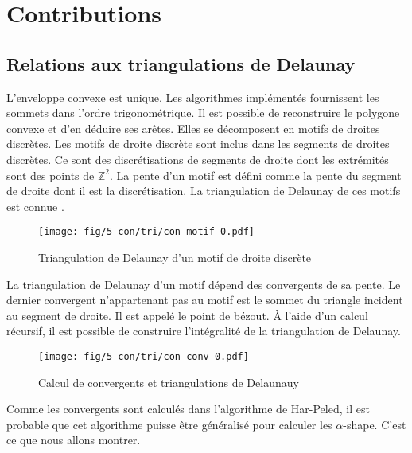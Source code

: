 \section{Contributions}

\subsection{Relations aux triangulations de Delaunay}


L'enveloppe convexe est unique. Les algorithmes implémentés fournissent les sommets dans l'ordre trigonométrique. Il est possible de reconstruire le polygone convexe et d'en déduire ses arêtes. Elles se décomposent en motifs de droites discrètes. Les motifs de droite discrète sont inclus dans les segments de droites discrètes. Ce sont des discrétisations de segments de droite dont les extrémités sont des points de $\mathbb{Z}^2$. La pente d'un motif est défini comme la pente du segment de droite dont il est la discrétisation. La triangulation de Delaunay de ces motifs est connue \cite{RoussillonL11}.\\

\begin{figure}[H]
  \centering
  \texttt{[image: fig/5-con/tri/con-motif-0.pdf]}
  \caption{Triangulation de Delaunay d'un motif de droite discrète}
\end{figure}

La triangulation de Delaunay d'un motif dépend des convergents de sa pente. Le dernier convergent n'appartenant pas au motif est le sommet du triangle incident au segment de droite. Il est appelé le point de bézout. À l'aide d'un calcul récursif, il est possible de construire l'intégralité de la triangulation de Delaunay.

\begin{figure}[H]
  \centering
  \texttt{[image: fig/5-con/tri/con-conv-0.pdf]}
  \caption{Calcul de convergents et triangulations de Delaunauy}
\end{figure}

Comme les convergents sont calculés dans l’algorithme de Har-Peled, il est probable que cet algorithme puisse être généralisé pour calculer les $\alpha$-shape. C'est ce que nous allons montrer.  

